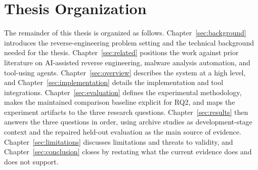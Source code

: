 \section{Thesis Organization}

The remainder of this thesis is organized as follows. Chapter~\ref{sec:background} introduces the reverse-engineering problem setting and the technical background needed for the thesis. Chapter~\ref{sec:related} positions the work against prior literature on AI-assisted reverse engineering, malware analysis automation, and tool-using agents. Chapter~\ref{sec:overview} describes the system at a high level, and Chapter~\ref{sec:implementation} details the implementation and tool integrations. Chapter~\ref{sec:evaluation} defines the experimental methodology, makes the maintained comparison baseline explicit for RQ2, and maps the experiment artifacts to the three research questions. Chapter~\ref{sec:results} then answers the three questions in order, using archive studies as development-stage context and the repaired held-out evaluation as the main source of evidence. Chapter~\ref{sec:limitations} discusses limitations and threats to validity, and Chapter~\ref{sec:conclusion} closes by restating what the current evidence does and does not support.

